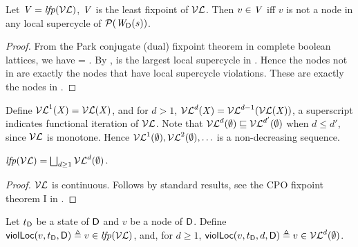 \begin{proposition} \label{prop:LFPisLocScViolations}
Let  $\VS= \lfp{\lVFs}$, \ie $\VS$ is the least fixpoint of $\lVFs$. Then $v \in \VS$ iff 
$v$ is not a node in any local supercycle of $\lwfgS{B}{s}{\DS}$.
\end{proposition}
%
\begin{proof}
From the Park conjugate (dual) fixpoint theorem in complete boolean lattices, we have 
\lfp{\VFs} = \compl{\gfp{\SFs}}.
By , \gfp{\SFs} is the largest local supercycle in . Hence the nodes not in 
\gfp{\SFs} are exactly the nodes that have local supercycle violations. These are exactly the nodes in \lfp{\VFs}.
\end{proof}

Define $\lVFi{\XS}{1} = \lVF{\XS}$, and for $d > 1$, 
$\lVFi{\XS}{d} = \lVFi{\lVF{\XS}}{d-1}$, \ie a superscript indicates functional iteration
of $\lVFs$. Note that 
$\lVFi{\ewfg}{d} \subg \lVFi{\ewfg}{d'}$ when $d \le d'$, since $\lVFs$
is monotone.
Hence $\lVFi{\ewfg}{1}, \lVFi{\ewfg}{2}, \ldots$ is a non-decreasing sequence.

\begin{proposition} \label{prop:computeLocLFP}
$\lfp{\lVFs} = \JOIN_{d \ge 1} \lVFs^{d} (\ewfg)$.
\end{proposition}
%
\begin{proof}
$\lVFs$ is continuous. Follows by standard results, \eg see the CPO fixpoint theorem I in 
\cite{DP02}.
\end{proof}










\begin{definition}
\label{def:supercycle.violation.local}
\label{defn:supercycle.violation.local}
Let $t_\DS$ be a state of $\dsk{\act}{\l}$ and $v$ be a node of $\dsk{\act}{\l}$.
Define 
$\scVL{v}{t_\DS}{\act}{\l} \df v \in \lfp{\lVFs}$,
and, for $d \ge 1$, $\scVLd{v}{d}{t_\DS}{\act}{\l} \df v \in \lVFs^{d} (\ewfg)$.
\end{definition}

